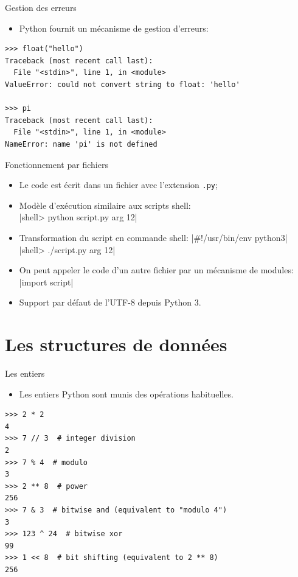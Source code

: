 \documentclass[dvipsnames]{beamer}
\providecommand{\tightlist}{%
  \setlength{\itemsep}{0pt}\setlength{\parskip}{0pt}}
\begin{document}
\begin{frame}[fragile]{Gestion des erreurs}

    \begin{itemize}
        \tightlist
        \item Python fournit un mécanisme de gestion d'erreurs:
    \end{itemize}

    \begin{verbatim}
>>> float("hello")
Traceback (most recent call last):
  File "<stdin>", line 1, in <module>
ValueError: could not convert string to float: 'hello'

>>> pi
Traceback (most recent call last):
  File "<stdin>", line 1, in <module>
NameError: name 'pi' is not defined

\end{verbatim}

\end{frame}

\begin{frame}
    [fragile]{Fonctionnement par fichiers}
    \begin{itemize}
        \item Le code est écrit dans un fichier avec l'extension \texttt{.py};
        \item Modèle d'exécution similaire aux scripts shell:\\
              |shell> python script.py arg 12|
        \item Transformation du script en commande shell:
              |#!/usr/bin/env python3|
              |shell> ./script.py arg 12|
        \item On peut appeler le code d'un autre fichier par un mécanisme
              de modules:\\
              |import script|
        \item Support par défaut de l'UTF-8 depuis Python 3.
    \end{itemize}

\end{frame}

\section{Les structures de données}

\begin{frame}
    [fragile]{Les entiers}
    \begin{itemize}
        \item Les entiers Python sont munis des opérations habituelles.
    \end{itemize}

    \begin{verbatim}
>>> 2 * 2
4
>>> 7 // 3  # integer division
2
>>> 7 % 4  # modulo
3
>>> 2 ** 8  # power
256
>>> 7 & 3  # bitwise and (equivalent to "modulo 4")
3
>>> 123 ^ 24  # bitwise xor
99
>>> 1 << 8  # bit shifting (equivalent to 2 ** 8)
256
\end{verbatim}
\end{frame}
\end{document}
